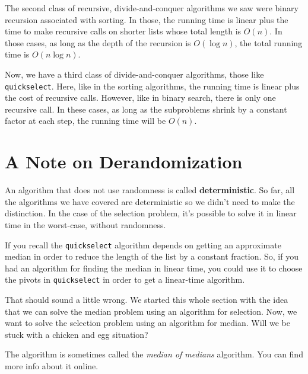 The second class of recursive, divide-and-conquer algorithms we saw were binary recursion associated with sorting.  In those, the running time is linear plus the time to make recursive calls on shorter lists whose total length is $O(n)$.  In those cases, as long as the depth of the recursion is $O(\log n)$, the total running time is $O(n \log n)$.


Now, we have a third class of divide-and-conquer algorithms, those like \texttt{quickselect}.  Here, like in the sorting algorithms, the running time is linear plus the cost of recursive calls.  However, like in binary search, there is only one recursive call.  In these cases, as long as the subproblems shrink by a constant factor at each step, the running time will be $O(n)$.

\section{A Note on Derandomization}


An algorithm that does not use randomness is called \textbf{deterministic}.  So far, all the algorithms we have covered are deterministic so we didn't need to make the distinction.  In the case of the selection problem, it's possible to solve it in linear time in the worst-case, without randomness.


If you recall the \texttt{quickselect} algorithm depends on getting an approximate median in order to reduce the length of the list by a constant fraction.
So, if you had an algorithm for finding the median in linear time, you could use it to choose the pivots in \texttt{quickselect} in order to get a linear-time algorithm.


That should sound a little wrong.
We started this whole section with the idea that we can solve the median problem using an algorithm for selection.
Now, we want to solve the selection problem using an algorithm for median.
Will we be stuck with a chicken and egg situation?


The algorithm is sometimes called the \emph{median of medians} algorithm.  You can find more info about it online.
